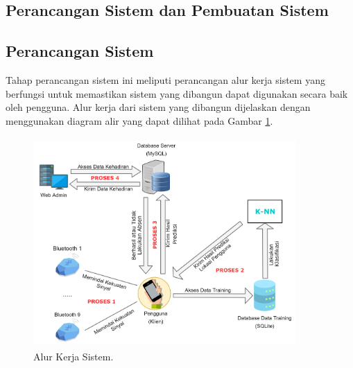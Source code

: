 \subsection{Perancangan Sistem dan Pembuatan Sistem}
\subsection{Perancangan Sistem}
Tahap perancangan sistem ini meliputi perancangan alur kerja sistem yang berfungsi untuk memastikan sistem yang dibangun dapat digunakan secara baik oleh pengguna. Alur kerja dari sistem yang dibangun dijelaskan dengan menggunakan diagram alir yang dapat dilihat pada Gambar \ref{alur-kerja-sistem}.

\begin{figure}[H]
\centering
\includegraphics[width=10cm, height=8cm]{gambar/alur-kerja-aplikasi}
\caption{Alur Kerja Sistem.}
\label{alur-kerja-sistem}
\end{figure}

